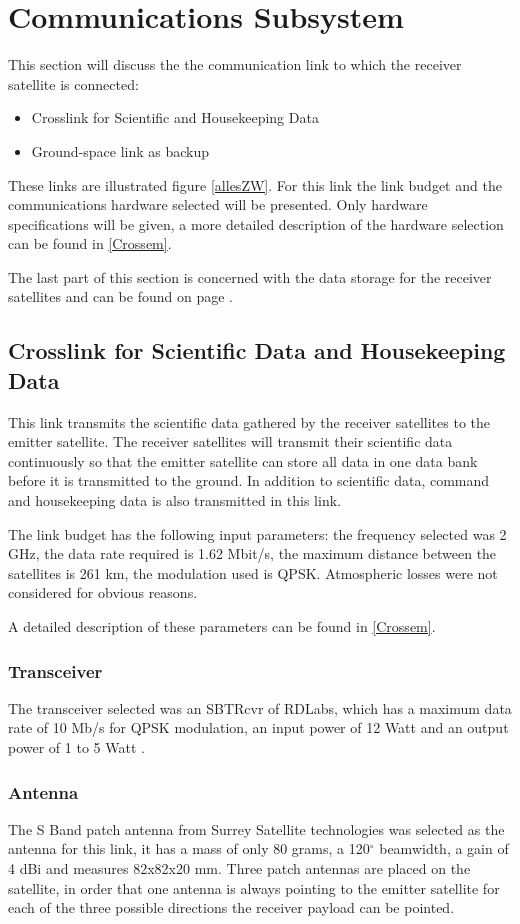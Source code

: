 \section{Communications Subsystem}
This section will discuss the  the communication link to which the receiver satellite is connected:
\begin{itemize}
\item Crosslink for Scientific and Housekeeping Data
\item Ground-space link as backup
\end{itemize}

These links are illustrated figure \ref{allesZW}.
For this link the link budget and the communications hardware selected will be presented. Only hardware specifications will be given, a more detailed description of the hardware selection can be found in \ref{Crossem}.

The last part of this section is concerned with the data storage for the receiver satellites and can be found on page \pageref{DSReceiver}.

\subsection{Crosslink for Scientific Data and Housekeeping Data}
This link transmits the scientific data gathered by the receiver satellites to the emitter satellite. The receiver satellites will transmit their scientific data continuously so that the emitter satellite can store all data in one data bank before it is transmitted to the ground. In addition to scientific data, command and housekeeping data is also transmitted in this link.

The link budget has the following input parameters: the frequency selected was 2 GHz, the data rate required is 1.62 Mbit/s, the maximum distance between the satellites is 261 km, the modulation used is QPSK. Atmospheric losses were not considered for obvious reasons.

A detailed description of these parameters can be found in \ref{Crossem}.

\subsubsection{Transceiver}
The transceiver selected was an SBTRcvr of RDLabs, which has a maximum data rate of 10 Mb/s for QPSK modulation, an input power of 12 Watt and an output power of 1 to 5 Watt \cite{RDLabs}.

\subsubsection{Antenna}
The S Band patch antenna from Surrey Satellite technologies\cite{SurrPatch} was selected as the antenna for this link, it has a mass of only 80 grams, a 120$^{\circ}$ beamwidth, a gain of 4 dBi and measures 82x82x20 mm. Three patch antennas are placed on the satellite, in order that one antenna is always pointing to the emitter satellite for each of the three possible directions the receiver payload can be pointed.

